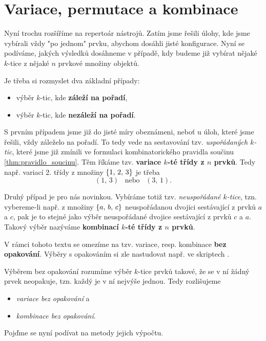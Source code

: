 \section{Variace, permutace a kombinace}

Nyní trochu rozšíříme na repertoár nástrojů. Zatím jsme řešili úlohy, kde jsme vybírali vždy "po jednom" prvku, abychom dosáhli jisté konfigurace. Nyní se podíváme, jakých výsledků dosáhneme v případě, kdy budeme již vybírat nějaké $k$-tice z nějaké $n$ prvkové množiny objektů.\par
Je třeba si rozmyslet dva základní případy:
\begin{itemize}
    \item výběr $k$-tic, kde \textbf{záleží na pořadí},
    \item výběr $k$-tic, kde \textbf{nezáleží na pořadí}.
\end{itemize}
S prvním případem jsme již do jisté míry obeznámeni, neboť u úloh, které jsme řešili, vždy záleželo na pořadí. To tedy vede na sestavování tzv. \emph{uspořádaných $k$-tic}, které jsme již zmínili ve formulaci kombinatorického pravidla součinu \ref{thm:pravidlo_soucinu}. Těm říkáme tzv. \textbf{variace $k$-té třídy z $n$ prvků}. Tedy např. variací 2. třídy z množiny $\left\{1,\,2,\,3\right\}$ je třeba
\begin{equation*}
    (1,\,3)\;\;\;\text{nebo}\;\;\;(3,\,1).
\end{equation*}

Druhý případ je pro nás novinkou. Vybíráme totiž tzv. \emph{neuspořádané $k$-tice}, tzn. vybereme-li např. z množiny $\left\{a,\,b,\,c\right\}$ neuspořádanou dvojici sestávající z prvků $a$ a $c$, pak je to stejné jako výběr neuspořádané dvojice sestávající z prvků $c$ a $a$. Takový výběr nazýváme \textbf{kombinací $k$-té třídy z $n$ prvků}.\par
V rámci tohoto textu se omezíme na tzv. variace, resp. kombinace \textbf{bez opakování}. Výběry s opakováním si zle nastudovat např. ve skriptech \citep[str. 9]{Slavik2022}.
\medskip

Výběrem bez opakování rozumíme výběr $k$-tice prvků takové, že se v ní žádný prvek neopakuje, tzn. každý je v ní nejvýše jednou. Tedy rozlišujeme
\begin{itemize}
    \item \emph{variace bez opakování} a
    \item \emph{kombinace bez opakování}.
\end{itemize}
Pojďme se nyní podívat na metody jejich výpočtu.

